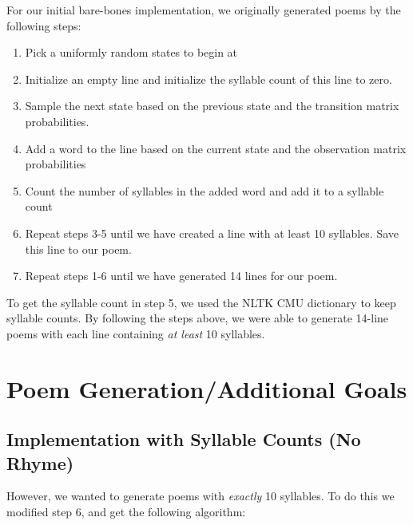 For our initial bare-bones implementation, we originally generated poems by the following steps:

\begin{enumerate}

\item Pick a uniformly random states to begin at

\item Initialize an empty line and initialize the syllable count of this line to zero.

\item Sample the next state based on the previous state and the transition matrix probabilities.

\item Add a word to the line based on the current state and the observation matrix probabilities

\item Count the number of syllables in the added word and add it to a syllable count

\item Repeat steps 3-5 until we have created a line with at least 10 syllables. Save this line to our poem.

\item Repeat steps 1-6 until we have generated 14 lines for our poem.

\end{enumerate}

To get the syllable count in step 5, we used the NLTK CMU dictionary to keep syllable counts. By following the steps above, we were able to generate 14-line poems with each line containing \textit{at least} 10 syllables. 

\section{Poem Generation/Additional Goals}

\subsection*{Implementation with Syllable Counts (No Rhyme)}

However, we wanted to generate poems with \textit{exactly} 10 syllables. To do this we modified step 6, and get the following algorithm:

